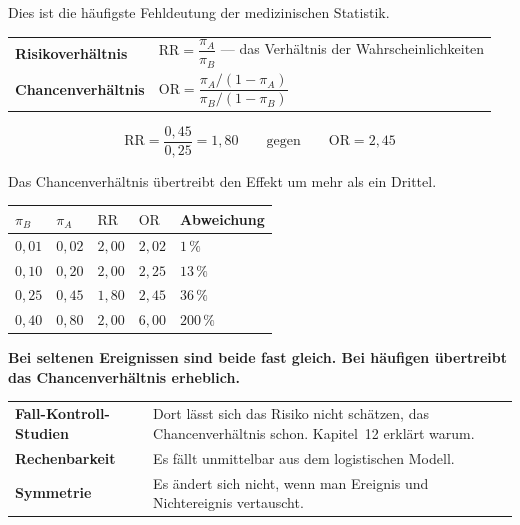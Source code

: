 \begin{warnung}
Dies ist die häufigste Fehldeutung der medizinischen Statistik.

\begin{center}
\renewcommand{\arraystretch}{1.5}
\begin{tabular}{@{}P{3.2cm}P{5.4cm}@{}}
\toprule
\textbf{Risiko\-verhältnis} & $\mathrm{RR} = \dfrac{\pi_A}{\pi_B}$ --- das Verhältnis der Wahrscheinlichkeiten\\[6pt]
\textbf{Chancen\-verhältnis} & $\mathrm{OR} = \dfrac{\pi_A/(1-\pi_A)}{\pi_B/(1-\pi_B)}$\\
\bottomrule
\end{tabular}
\end{center}

\[ \mathrm{RR} = \frac{0{,}45}{0{,}25} = 1{,}80 \qquad \text{gegen} \qquad \mathrm{OR} = 2{,}45 \]

Das Chancenverhältnis übertreibt den Effekt um mehr als ein Drittel.

\begin{center}
{\small
\renewcommand{\arraystretch}{1.45}
\begin{tabular}{@{}P{1.4cm}P{1.4cm}P{1.4cm}P{1.4cm}P{1.8cm}@{}}
\toprule
$\pi_B$ & $\pi_A$ & $\mathrm{RR}$ & $\mathrm{OR}$ & \textbf{Abwei\-chung}\\
\midrule
$0{,}01$ & $0{,}02$ & $2{,}00$ & $2{,}02$ & \textcolor{gruen}{$1\,\%$}\\
$0{,}10$ & $0{,}20$ & $2{,}00$ & $2{,}25$ & $13\,\%$\\
$0{,}25$ & $0{,}45$ & $1{,}80$ & $2{,}45$ & $36\,\%$\\
$0{,}40$ & $0{,}80$ & $2{,}00$ & $6{,}00$ & \textcolor{akzent}{$200\,\%$}\\
\bottomrule
\end{tabular}}
\end{center}

\begin{center}
\begin{minipage}{0.9\textwidth}
\textbf{Bei seltenen Ereignissen sind beide fast gleich. Bei häufigen übertreibt das Chancenverhältnis erheblich.}
\end{minipage}
\end{center}

\begin{center}
\renewcommand{\arraystretch}{1.5}
\begin{tabular}{@{}P{2.6cm}P{6.0cm}@{}}
\toprule
\textbf{Fall-Kontroll-Studien} & Dort lässt sich das Risiko nicht schätzen, das Chancenverhältnis schon. Kapitel~12 erklärt warum.\\
\textbf{Rechenbarkeit} & Es fällt unmittelbar aus dem logistischen Modell.\\
\textbf{Symmetrie} & Es ändert sich nicht, wenn man Ereignis und Nichtereignis vertauscht.\\
\bottomrule
\end{tabular}
\end{center}


\end{warnung}
